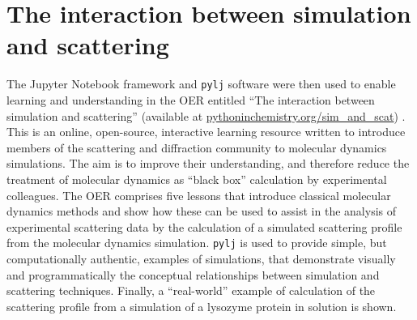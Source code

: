 \section{The interaction between simulation and scattering}
\label{sec:sim_and_scat}
The Jupyter Notebook framework and \texttt{pylj} software were then used to enable learning and understanding in the OER entitled ``The interaction between simulation and scattering'' (available at \href{https://pythoninchemistry.org/sim_and_scat}{pythoninchemistry.org/sim\_and\_scat}) \cite{mccluskey_pythoninchemistry/sim_and_scat_2019}.
This is an online, open-source, interactive learning resource written to introduce members of the scattering and diffraction community to molecular dynamics simulations.
The aim is to improve their understanding, and therefore reduce the treatment of molecular dynamics as ``black box'' calculation by experimental colleagues.
The OER comprises five lessons that introduce classical molecular dynamics methods and show how these can be used to assist in the analysis of experimental scattering data by the calculation of a simulated scattering profile from the molecular dynamics simulation.
\texttt{pylj} is used to provide simple, but computationally authentic, examples of simulations, that demonstrate visually and programmatically the conceptual relationships between simulation and scattering techniques.
Finally, a ``real-world'' example of calculation of the scattering profile from a simulation of a lysozyme protein in solution is shown.

